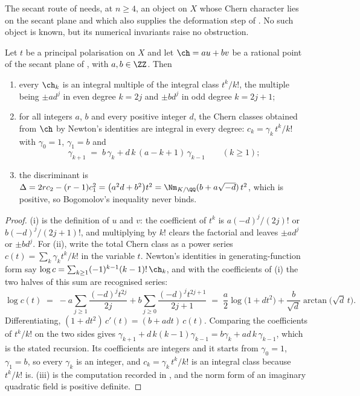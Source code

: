 The secant route of  needs, at $n\ge4$, an object on
$X$ whose Chern character lies on the secant plane and which also supplies the
deformation step of . No such object is known, but its
numerical invariants raise no obstruction.

\begin{proposition}%
\label{prop:notforbidden}
Let $t$ be a principal polarisation on $X$ and let
$\ch=au+bv$ be a rational point of the secant plane of ,
with $a,b\in\ZZ$. Then
\begin{enumerate}[label=\textup{(\roman*)},nosep]
\item every $\ch_{k}$ is an integral multiple of the integral class
  $t^{k}/k!$, the multiple being $\pm a d^{j}$ in even degree $k=2j$ and
  $\pm b d^{j}$ in odd degree $k=2j+1$;
\item for all integers $a$, $b$ and every positive integer $d$, the Chern
  classes obtained from $\ch$ by Newton's identities are integral in every
  degree: $c_{k}=\gamma_{k}\,t^{k}/k!$ with $\gamma_{0}=1$, $\gamma_{1}=b$ and
  \[
    \gamma_{k+1}\;=\;b\,\gamma_{k}+d\,k\,(a-k+1)\,\gamma_{k-1}\qquad(k\ge1);
  \]
\item the discriminant is
  $\Delta=2rc_{2}-(r-1)c_{1}^{2}=\bigl(a^{2}d+b^{2}\bigr)t^{2}
  =\Nm_{K/\QQ}(b+a\sqrt{-d})\,t^{2}$, which is positive, so Bogomolov's
  inequality never binds.
\end{enumerate}
\end{proposition}

\begin{proof}
(i) is the definition of $u$ and $v$: the coefficient of $t^{k}$ is
$a(-d)^{j}/(2j)!$ or $b(-d)^{j}/(2j+1)!$, and multiplying by $k!$ clears the
factorial and leaves $\pm ad^{j}$ or $\pm bd^{j}$. For (ii), write the total
Chern class as a power series $c(t)=\sum_{k}\gamma_{k}t^{k}/k!$ in the
variable $t$. Newton's identities in generating-function form say
$\log c=\sum_{k\ge1}(-1)^{k-1}(k-1)!\,\ch_{k}$, and with the coefficients of
(i) the two halves of this sum are recognised series:
\[
  \log c(t)\;=\;-a\sum_{j\ge1}\frac{(-d)^{j}t^{2j}}{2j}
     +b\sum_{j\ge0}\frac{(-d)^{j}t^{2j+1}}{2j+1}
  \;=\;\frac{a}{2}\log\bigl(1+dt^{2}\bigr)
     +\frac{b}{\sqrt{d}}\arctan\bigl(\sqrt{d}\,t\bigr).
\]
Differentiating, $(1+dt^{2})\,c'(t)=(b+adt)\,c(t)$. Comparing the
coefficients of $t^{k}/k!$ on the two sides gives
$\gamma_{k+1}+d\,k(k-1)\gamma_{k-1}=b\gamma_{k}+ad\,k\,\gamma_{k-1}$, which is
the stated recursion. Its coefficients are integers and it starts from
$\gamma_{0}=1$, $\gamma_{1}=b$, so every $\gamma_{k}$ is an integer, and
$c_{k}=\gamma_{k}\,t^{k}/k!$ is an integral class because $t^{k}/k!$ is. (iii) is the computation recorded in
, and the norm form of an imaginary quadratic field
is positive definite.
\end{proof}

